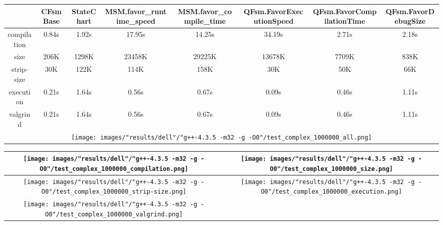 \begin{landscape}
\begin{table}
\caption{"dell" [df6407d], g++-4.3.5 -m32 -g -O0/test complex 1000000}
\centering
\begin{longtable}{| c | c |c |c |c |c |c |c |}
\hline
& CFsmBase& StateChart& MSM.favor\_runtime\_speed& MSM.favor\_compile\_time& QFsm.FavorExecutionSpeed& QFsm.FavorCompilationTime& QFsm.FavorDebugSize\\
\hline
compilation & 0.84s & 1.92s & 17.95s & 14.25s & 34.19s & 2.71s & 2.18s\\
\hline
size & 206K & 1298K & 23458K & 29225K & 13678K & 7709K & 838K\\
\hline
strip-size & 30K & 122K & 114K & 158K & 30K & 50K & 66K\\
\hline
execution & 0.21s & 1.64s & 0.56s & 0.67s & 0.09s & 0.46s & 1.11s\\
\hline
valgrind & 0.21s & 1.64s & 0.56s & 0.67s & 0.09s & 0.46s & 1.11s\\
\hline
\multicolumn{8}{|c|}{\texttt{[image: images/"results/dell"/"g++-4.3.5 -m32 -g -O0"/test\_complex\_1000000\_all.png]}}\\
\hline
\end{longtable}
\end{table}
\end{landscape}
\newpage
\begin{table}
\centering
\begin{longtable}{| c | c |}
\hline
\texttt{[image: images/"results/dell"/"g++-4.3.5 -m32 -g -O0"/test\_complex\_1000000\_compilation.png]}& \texttt{[image: images/"results/dell"/"g++-4.3.5 -m32 -g -O0"/test\_complex\_1000000\_size.png]}\\
\hline
\texttt{[image: images/"results/dell"/"g++-4.3.5 -m32 -g -O0"/test\_complex\_1000000\_strip-size.png]}& \texttt{[image: images/"results/dell"/"g++-4.3.5 -m32 -g -O0"/test\_complex\_1000000\_execution.png]}\\
\hline
\texttt{[image: images/"results/dell"/"g++-4.3.5 -m32 -g -O0"/test\_complex\_1000000\_valgrind.png]}& \\ \hline
\end{longtable}
\end{table}
